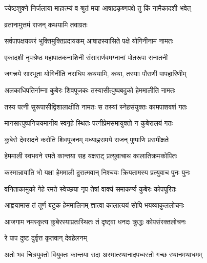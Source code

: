 
\twolineshloka
{ज्येष्ठशुक्ने निर्जलाया माहात्म्यं व श्रुतं मया}
{आषाढकृष्णपक्षे तु किं नामैकादशी भवेत्} %



\onelineshloka
{व्रतानामुत्तमं राजन् कथयामि तवाग्रतः} %

\twolineshloka
{सर्वपापक्षयकरं भुक्तिमुक्तिप्रदायकम्}
{आषाढस्यासिते पक्षे योगिनीनाम नामतः} %

\twolineshloka
{एकादशी नृपश्रेष्ठ महापातकनाशिनी}
{संसारार्णवमग्नानां पोतरूपा सनातनी} %

\twolineshloka
{जगत्त्रये सारभूता योगिनीति नराधिप}
{कथयामि, कथा, तस्याः पौराणी पापहारिणीम्} %

\twolineshloka
{अलकाधिपतिर्नाम्ना कुबेरः शिवपूजकः}
{तस्यासीत्पुष्पबदुको हेममालीति नामतः} %

\twolineshloka
{तस्य पत्नी सुरूपासीद्विशालाक्षीति नामतः}
{स तस्यां स्नेहसंयुक्तः कामपाशवशं गतः} %

\twolineshloka
{मानसात्पुष्पनिचयमानीय स्वगृहे स्थितः}
{पत्नीप्रेमसमायुक्तो न कुबेरालयं गतः} %

\twolineshloka
{कुबेरो देवसदने करोति शिवपूजनम्}
{मध्याह्नसमये राजन् पुष्पाणि प्रसमीक्षते} %

\twolineshloka
{हेममाली स्वभवने रमते कान्तया सह}
{यक्षराट् प्रत्युवाचाथ कालातिक्रमकोपितः} %

\twolineshloka
{कस्मान्नायाति भो यक्षा हेममाली दुरात्मवान्}
{निश्चयः क्रियतामस्य प्रत्युवाच पुनः पुनः} %


\twolineshloka
{वनिताकामुको गेहे रमते स्वेच्छया नृप}
{तेषां वाक्यं समाकर्ण्य कुबेरः कोपपूरितः} %

\twolineshloka
{आह्वयामास तं तूर्ण बटुक हेममालिनम्}
{ज्ञात्वा कालात्ययं सोपि भयव्याकुललोचनः} %

\twolineshloka
{आजगाम नमस्कृत्य कुबेरस्याप्रतःस्थितः}
{तं दृष्ट्वा धनदः क्रुद्धः कोपसंरक्तलोचनः} %



\onelineshloka
{रे पाप दुष्ट दुर्वृत्त कृतवान् देवहेलनम्} %

\twolineshloka
{अतो भव चित्रयुक्तो वियुक्तः कान्तया सदा}
{अस्मात्स्थानादपध्वस्तो गच्छ स्थानमथाधमम्} %

